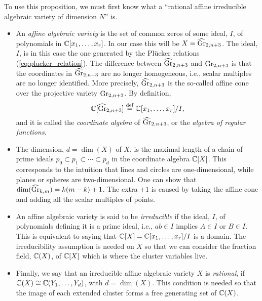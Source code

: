 To use this proposition, we must first know what a ``rational affine irreducible
algebraic variety of dimension $N$'' is.
\begin{itemize}
	\item An \emph{affine algebraic variety} is the set of common zeros of
	      some ideal, $I$, of polynomials in $\mathbb{C}[x_1, \dots, x_r]$. In our case this will be $X
		      = \widehat{\operatorname{Gr}}_{2, n+3}$. The ideal, $I$, is in this case the one generated by the Plücker
	      relations (\cref{eq:plucker_relation}). The difference between $\widehat{\operatorname{Gr}}_{2, n+3}$ and
	      $\operatorname{Gr}_{2,n+3}$ is that the coordinates in $\widehat{\operatorname{Gr}}_{2, n+3}$ are no longer homogeneous,
	      i.e., scalar multiples are no longer identified. More precisely, $\widehat{\operatorname{Gr}}_{2, n+3}$ is
	      the so-called affine cone over the projective variety $\operatorname{Gr}_{2,n+3}$. By definition,
	      \begin{equation*}
		      \mathbb{C}[\widehat{\operatorname{Gr}}_{2, n+3}] \overset{\mathrm{def}}{=} \mathbb{C}[x_1, \dots, x_r]/I,
	      \end{equation*}
	      and it is called the \emph{coordinate algebra} of $\widehat{\operatorname{Gr}}_{2, n+3}$, or the \emph{algebra of
		      regular functions}.
	\item The dimension, $d = \dim(X)$ of $X$, is the maximal length of a chain of prime ideals
	      $p_0 \subset p_1 \subset \dotsb \subset p_d$ in the coordinate algebra $\mathbb{C}[X]$. This
	      corresponds to the intuition that lines and circles are one-dimensional, while planes
	      or spheres are two-dimensional. One can show that $\dim(\widehat{\operatorname{Gr}}_{k,m}) = k(m-k) + 1$.
	      The extra $+1$ is caused by taking the affine cone and adding all the scalar multiples
	      of points.
	\item An affine algebraic variety is said to be \emph{irreducible}
	      if the ideal, $I$, of polynomials defining it is a prime ideal, i.e., $ab \in I$
	      implies $A\in I$ or $B \in I$. This is equivalent to saying that $\mathbb{C}[X] = \mathbb{C}[x_1,
			      \dots, x_r]/I$ is a domain. The irreducibility assumption is needed on $X$ so that we
	      can consider the fraction field, $\mathbb{C}(X)$, of $\mathbb{C}[X]$ which is where the cluster
	      variables live.
	\item Finally, we say that an irreducible affine algebraic variety $X$ is
	      \emph{rational}, if $\mathbb{C}(X) \cong \mathbb{C}(Y_1, \dots, Y_d)$, with
	      $d = \dim(X)$. This condition is needed so that the image of each extended cluster
	      forms a free generating set of $\mathbb{C}(X)$.
\end{itemize}

